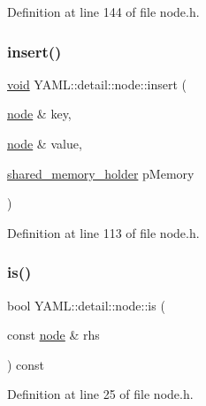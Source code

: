 Definition at line 144 of file node.\+h.

\mbox{\label{class_y_a_m_l_1_1detail_1_1node_aa8445f807834ea2f58bd9d241f59f489}} 
\subsubsection{\texorpdfstring{insert()}{insert()}}
{\footnotesize\ttfamily \mbox{\hyperlink{glad_8h_a950fc91edb4504f62f1c577bf4727c29}{void}} Y\+A\+M\+L\+::detail\+::node\+::insert (\begin{DoxyParamCaption}\item[{\mbox{\hyperlink{class_y_a_m_l_1_1detail_1_1node}{node}} \&}]{key,  }\item[{\mbox{\hyperlink{class_y_a_m_l_1_1detail_1_1node}{node}} \&}]{value,  }\item[{\mbox{\hyperlink{namespace_y_a_m_l_1_1detail_a228c4b3b6ba1058b474d40afc218e21d}{shared\+\_\+memory\+\_\+holder}}}]{p\+Memory }\end{DoxyParamCaption})\hspace{0.3cm}{\ttfamily [inline]}}



Definition at line 113 of file node.\+h.

\mbox{\label{class_y_a_m_l_1_1detail_1_1node_ab9c9991697c59ac00def1d5192c1eedf}} 
\subsubsection{\texorpdfstring{is()}{is()}}
{\footnotesize\ttfamily bool Y\+A\+M\+L\+::detail\+::node\+::is (\begin{DoxyParamCaption}\item[{const \mbox{\hyperlink{class_y_a_m_l_1_1detail_1_1node}{node}} \&}]{rhs }\end{DoxyParamCaption}) const\hspace{0.3cm}{\ttfamily [inline]}}



Definition at line 25 of file node.\+h.

\mbox{\label{class_y_a_m_l_1_1detail_1_1node_a18d5d6bb65a79aa3ea9067e5194167ad}} 
